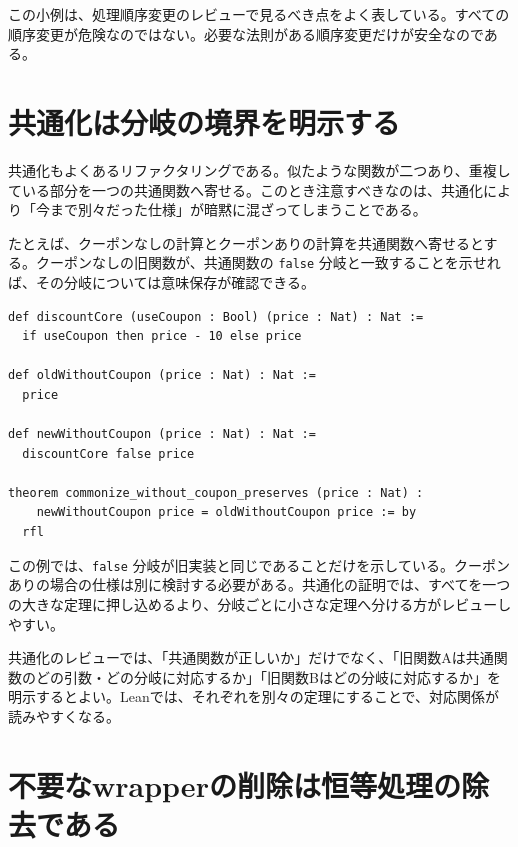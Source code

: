 この小例は、処理順序変更のレビューで見るべき点をよく表している。すべての順序変更が危険なのではない。必要な法則がある順序変更だけが安全なのである。

\section{共通化は分岐の境界を明示する}

共通化もよくあるリファクタリングである。似たような関数が二つあり、重複している部分を一つの共通関数へ寄せる。このとき注意すべきなのは、共通化により「今まで別々だった仕様」が暗黙に混ざってしまうことである。

たとえば、クーポンなしの計算とクーポンありの計算を共通関数へ寄せるとする。クーポンなしの旧関数が、共通関数の \texttt{false} 分岐と一致することを示せれば、その分岐については意味保存が確認できる。

\begin{listing}[htbp]
\begin{verbatim}
def discountCore (useCoupon : Bool) (price : Nat) : Nat :=
  if useCoupon then price - 10 else price

def oldWithoutCoupon (price : Nat) : Nat :=
  price

def newWithoutCoupon (price : Nat) : Nat :=
  discountCore false price

theorem commonize_without_coupon_preserves (price : Nat) :
    newWithoutCoupon price = oldWithoutCoupon price := by
  rfl
\end{verbatim}
\caption{共通化後の特定分岐が旧実装と一致することを示す}
\label{lst:ch28-commonize-preserves}
\end{listing}

この例では、\texttt{false} 分岐が旧実装と同じであることだけを示している。クーポンありの場合の仕様は別に検討する必要がある。共通化の証明では、すべてを一つの大きな定理に押し込めるより、分岐ごとに小さな定理へ分ける方がレビューしやすい。

\begin{softwarebox}
共通化のレビューでは、「共通関数が正しいか」だけでなく、「旧関数Aは共通関数のどの引数・どの分岐に対応するか」「旧関数Bはどの分岐に対応するか」を明示するとよい。Leanでは、それぞれを別々の定理にすることで、対応関係が読みやすくなる。
\end{softwarebox}

\section{不要なwrapperの削除は恒等処理の除去である}

